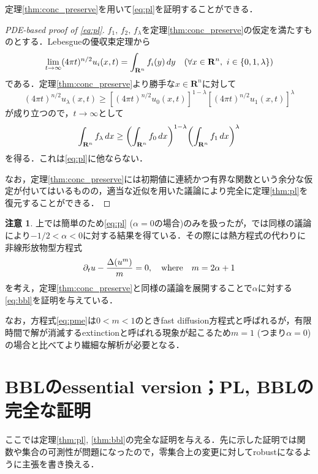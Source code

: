 \documentclass[a4j]{ltjsarticle}
\newcommand{\Rset}{\mathbf{R}}
\newcommand{\1}{\bm{1}}
\numberwithin{equation}{section}
\theoremstyle{definition}
\newtheorem{rmk}[thm]{注意}
\begin{document}
定理\ref{thm:conc_preserve}を用いて\eqref{eq:pl}を証明することができる．
\begin{proof}[PDE-based proof of \eqref{eq:pl}]
    $f_1,\,f_2,\,f_\lambda$を定理\ref{thm:conc_preserve}の仮定を満たすものとする．Lebesgueの優収束定理から
    \begin{equation}
        \lim_{t\to\infty}(4\pi t)^{n/2}u_i(x,t)=\int_{\Rset^n}f_i(y)\,dy\quad (\forall x\in\Rset^n,\ i\in\qty{0,1,\lambda})
    \end{equation}
    である．定理\ref{thm:conc_preserve}より勝手な$x\in\Rset^n$に対して
    \begin{equation}
        (4\pi t)^{n/2}u_{\lambda}(x,t)\geq [(4\pi t)^{n/2}u_0(x,t)]^{1-\lambda}[(4\pi t)^{n/2} u_1(x,t)]^{\lambda}
    \end{equation}
    が成り立つので，$t\to\infty$として
    \begin{equation}
        \int_{\Rset^n}f_\lambda\,dx\geq \qty(\int_{\Rset^n}f_0\,dx)^{1-\lambda}\qty(\int_{\Rset^n}f_1\,dx)^{\lambda}
    \end{equation}
    を得る．これは\eqref{eq:pl}に他ならない．

    なお，定理\ref{thm:conc_preserve}には初期値に連続かつ有界な関数という余分な仮定が付いてはいるものの，適当な近似を用いた議論により完全に定理\ref{thm:pl}を復元することができる．
\end{proof}
\begin{rmk}
    上では簡単のため\eqref{eq:pl} ($\alpha=0$の場合)のみを扱ったが，\cite{ILS}では同様の議論により$-1/2<\alpha<0$に対する結果を得ている．その際には熱方程式の代わりに非線形放物型方程式
    \begin{equation}
        \partial_t u-\frac{\Delta\qty(u^m)}{m}=0,\quad \text{where}\quad m=2\alpha+1\label{eq:pme}
    \end{equation}
    を考え，定理\ref{thm:conc_preserve}と同様の議論を展開することで$\alpha$に対する\eqref{eq:bbl}を証明を与えている．

    なお，方程式\eqref{eq:pme}は$0<m<1$のときfast diffusion方程式と呼ばれるが，有限時間で解が消滅するextinctionと呼ばれる現象が起こるため$m=1$ (つまり$\alpha=0$)の場合と比べてより繊細な解析が必要となる．
\end{rmk}

\appendix
\section{BBLのessential version；PL, BBLの完全な証明}\label{sec:ess_bbl}
\def\thesection{\Alph{section}}
ここでは定理\ref{thm:pl}, \ref{thm:bbl}の完全な証明を与える．先に示した証明では関数や集合の可測性が問題になったので，零集合上の変更に対してrobustになるように主張を書き換える．
\end{document}
